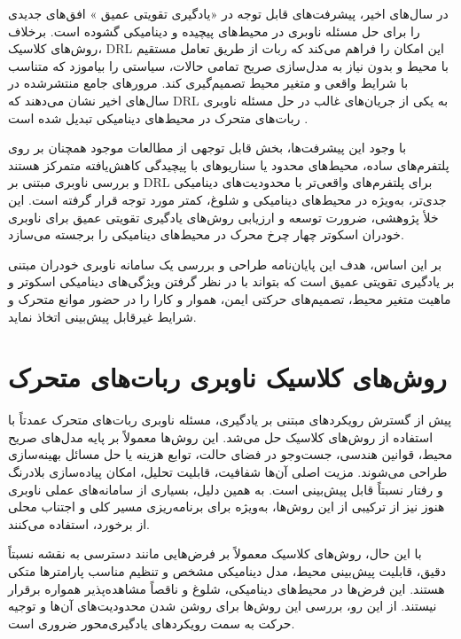 در سال‌های اخیر، پیشرفت‌های قابل توجه در «یادگیری تقویتی عمیق%
»
افق‌های جدیدی را برای حل مسئله ناوبری در محیط‌های پیچیده و دینامیکی گشوده است. برخلاف روش‌های کلاسیک، DRL این امکان را فراهم می‌کند که ربات از طریق تعامل مستقیم با محیط و بدون نیاز به مدل‌سازی صریح تمامی حالات، سیاستی را بیاموزد که متناسب با شرایط واقعی و متغیر محیط تصمیم‌گیری کند. مرورهای جامع منتشرشده در سال‌های اخیر نشان می‌دهند که DRL به یکی از جریان‌های غالب در حل مسئله ناوبری ربات‌های متحرک در محیط‌های دینامیکی تبدیل شده است%
\cite{Zhu2021,s25113394}.

با وجود این پیشرفت‌ها، بخش قابل توجهی از مطالعات موجود همچنان بر روی پلتفرم‌های ساده، محیط‌های محدود یا سناریوهای با پیچیدگی کاهش‌یافته متمرکز هستند و بررسی ناوبری مبتنی بر DRL برای پلتفرم‌های واقعی‌تر با محدودیت‌های دینامیکی جدی‌تر، به‌ویژه در محیط‌های دینامیکی و شلوغ، کمتر مورد توجه قرار گرفته است. این خلأ پژوهشی، ضرورت توسعه و ارزیابی روش‌های یادگیری تقویتی عمیق برای ناوبری خودران اسکوتر چهار چرخ محرک در محیط‌های دینامیکی را برجسته می‌سازد.

بر این اساس، هدف این پایان‌نامه طراحی و بررسی یک سامانه ناوبری خودران مبتنی بر یادگیری تقویتی عمیق است که بتواند با در نظر گرفتن ویژگی‌های دینامیکی اسکوتر و ماهیت متغیر محیط، تصمیم‌های حرکتی ایمن، هموار و کارا را در حضور موانع متحرک و شرایط غیرقابل پیش‌بینی اتخاذ نماید.

\section{روش‌های کلاسیک ناوبری ربات‌های متحرک}

پیش از گسترش رویکردهای مبتنی بر یادگیری، مسئله ناوبری ربات‌های متحرک عمدتاً با استفاده از روش‌های کلاسیک حل می‌شد. این روش‌ها معمولاً بر پایه مدل‌های صریح محیط، قوانین هندسی، جست‌وجو در فضای حالت، توابع هزینه یا حل مسائل بهینه‌سازی طراحی می‌شوند. مزیت اصلی آن‌ها شفافیت، قابلیت تحلیل، امکان پیاده‌سازی بلادرنگ و رفتار نسبتاً قابل پیش‌بینی است. به همین دلیل، بسیاری از سامانه‌های عملی ناوبری هنوز نیز از ترکیبی از این روش‌ها، به‌ویژه برای برنامه‌ریزی مسیر کلی و اجتناب محلی از برخورد، استفاده می‌کنند.

با این حال، روش‌های کلاسیک معمولاً بر فرض‌هایی مانند دسترسی به نقشه نسبتاً دقیق، قابلیت پیش‌بینی محیط، مدل دینامیکی مشخص و تنظیم مناسب پارامترها متکی هستند. این فرض‌ها در محیط‌های دینامیکی، شلوغ و ناقصاً مشاهده‌پذیر همواره برقرار نیستند. از این رو، بررسی این روش‌ها برای روشن شدن محدودیت‌های آن‌ها و توجیه حرکت به سمت رویکردهای یادگیری‌محور ضروری است.

